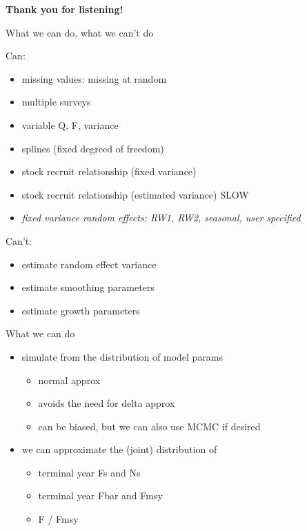 \documentclass{beamer}\usepackage[]{graphicx}\usepackage[]{color}
\begin{document}
\begin{frame}{}

\begin{center}
\Large\textbf{Thank you for listening!}
\end{center}

\end{frame}

\begin{frame}{What we can do, what we can't do}

Can:
\begin{itemize}
\item missing values: missing at random
\item multiple surveys
\item variable Q, F, variance
\item splines (fixed degreed of freedom)
\item stock recruit relationship (fixed variance)
\item stock recruit relationship (estimated variance) SLOW
\item \emph{fixed variance random effects: RW1, RW2, seasonal, user specified}
\end{itemize}

Can't:
\begin{itemize}
\item estimate random effect variance
\item estimate smoothing parameters
\item estimate growth parameters
\end{itemize}

\end{frame}

\begin{frame}{What we can do}

\begin{itemize}
\item simulate from the distribution of model params
\begin{itemize}
\item normal approx
\item avoids the need for delta approx
\item can be biased, but we can also use MCMC if desired
\end{itemize}
\item we can approximate the (joint) distribution of
\begin{itemize}
\item terminal year Fs and Ns
\item terminal year Fbar and Fmsy
\item F / Fmsy
\end{itemize}
\end{itemize}

\end{frame}
\end{document}

